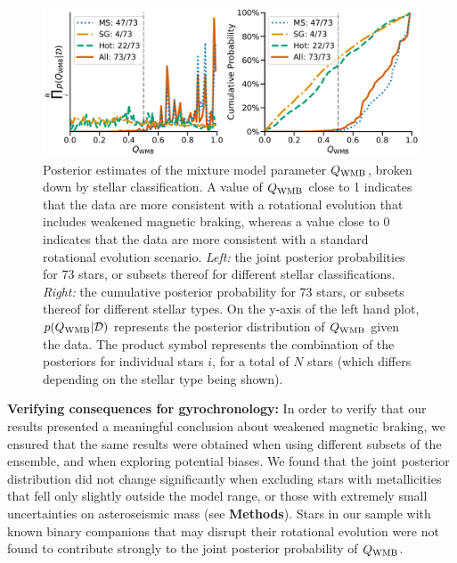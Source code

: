 \documentclass[12pt]{article}
\newcommand{\rtwo}[1]{{#1}}
\begin{document}
\begin{figure}
	\centering
	\includegraphics[width=\textwidth]{modelresults.pdf}
	\caption{Posterior estimates of the mixture model parameter $Q_{\rm WMB}$, broken down by stellar classification. A value of $Q_{\rm WMB}$ close to 1 indicates that the data are more consistent with a rotational evolution that includes weakened magnetic braking, whereas a value close to 0 indicates that the data are more consistent with a standard rotational evolution scenario. \textit{Left:} \rtwo{the joint posterior probabilities} for 73 stars, or subsets thereof for different stellar classifications. \textit{Right:} the cumulative posterior probability for 73 stars, or subsets thereof for different stellar types. On the y-axis of the left hand plot, $p(Q_{\rm WMB} | \mathcal{D})$ represents the posterior distribution of $Q_{\rm WMB}$ given the data. The product symbol represents the combination of the posteriors for individual stars $i$, for a total of $N$ stars (which differs depending on the stellar type being shown).}
	\label{fig:gyroresults}
\end{figure}

\textbf{Verifying consequences for gyrochronology:} In order to verify that our results presented a meaningful \rtwo{conclusion about} weakened magnetic braking, we ensured that the same results were obtained when using different subsets of the ensemble, and when exploring potential biases. We found that the joint posterior distribution did not change significantly when excluding stars with metallicities that fell only slightly outside the model range, or those with extremely small uncertainties on asteroseismic mass (see \textbf{Methods}). Stars in our sample with known binary companions that may disrupt their rotational evolution were not found to contribute strongly to the joint posterior probability of $Q_{\rm WMB}$. 
\end{document}
